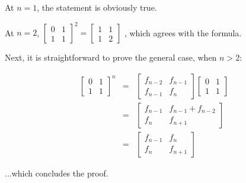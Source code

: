 \documentclass[12pt]{article}
\begin{document}
At $n=1$, the statement is obviously true.

At $n=2$, 
$
{\left[ \begin{array}{cc}
	0 & 1 \\
	1 & 1 \end{array} \right]}^2
=
\left[ \begin{array}{cc}
	1 & 1 \\
	1 & 2 \end{array} \right]
$
, which agrees with the formula.

Next, it is straightforward to prove the general case, when $n>2$:

\begin{eqnarray*}
{\left[ \begin{array}{cc}
	0 & 1 \\
	1 & 1 \end{array} \right]}^n
&=& 
\left[ \begin{array}{cc}
	f_{n-2}	&	f_{n-1} \\
	f_{n-1}	&	f_n \end{array} \right]
\left[ \begin{array}{cc}
	0 & 1 \\
	1 & 1 \end{array} \right]
\\
&=&
\left[ \begin{array}{cc}
	f_{n-1}	&	f_{n-1} + f_{n-2} \\
	f_n	&	f_{n+1} \end{array} \right]
\\
&=&
\left[ \begin{array}{cc}
	f_{n-1}	&	f_n \\
	f_n	&	f_{n+1} \end{array} \right]
\end{eqnarray*}

...which concludes the proof.
\end{document}
